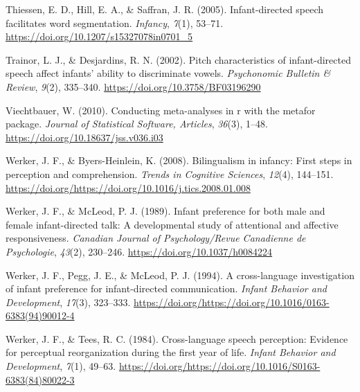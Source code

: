 \documentclass[,man,floatsintext]{apa6}
\begin{document}
\leavevmode\hypertarget{ref-thiessen_2005}{}%
Thiessen, E. D., Hill, E. A., \& Saffran, J. R. (2005). Infant-directed speech facilitates word segmentation. \emph{Infancy}, \emph{7}(1), 53--71. \url{https://doi.org/10.1207/s15327078in0701_5}

\leavevmode\hypertarget{ref-trainor_2002}{}%
Trainor, L. J., \& Desjardins, R. N. (2002). Pitch characteristics of infant-directed speech affect infants' ability to discriminate vowels. \emph{Psychonomic Bulletin \& Review}, \emph{9}(2), 335--340. \url{https://doi.org/10.3758/BF03196290}

\leavevmode\hypertarget{ref-viechtbauer_2010}{}%
Viechtbauer, W. (2010). Conducting meta-analyses in r with the metafor package. \emph{Journal of Statistical Software, Articles}, \emph{36}(3), 1--48. \url{https://doi.org/10.18637/jss.v036.i03}

\leavevmode\hypertarget{ref-werker_2008}{}%
Werker, J. F., \& Byers-Heinlein, K. (2008). Bilingualism in infancy: First steps in perception and comprehension. \emph{Trends in Cognitive Sciences}, \emph{12}(4), 144--151. \url{https://doi.org/https://doi.org/10.1016/j.tics.2008.01.008}

\leavevmode\hypertarget{ref-werker_1989}{}%
Werker, J. F., \& McLeod, P. J. (1989). Infant preference for both male and female infant-directed talk: A developmental study of attentional and affective responsiveness. \emph{Canadian Journal of Psychology/Revue Canadienne de Psychologie}, \emph{43}(2), 230--246. \url{https://doi.org/10.1037/h0084224}

\leavevmode\hypertarget{ref-werker_1994}{}%
Werker, J. F., Pegg, J. E., \& McLeod, P. J. (1994). A cross-language investigation of infant preference for infant-directed communication. \emph{Infant Behavior and Development}, \emph{17}(3), 323--333. \url{https://doi.org/https://doi.org/10.1016/0163-6383(94)90012-4}

\leavevmode\hypertarget{ref-werker_1984}{}%
Werker, J. F., \& Tees, R. C. (1984). Cross-language speech perception: Evidence for perceptual reorganization during the first year of life. \emph{Infant Behavior and Development}, \emph{7}(1), 49--63. \url{https://doi.org/https://doi.org/10.1016/S0163-6383(84)80022-3}

\endgroup

\clearpage
\makeatletter
\efloat@restorefloats
\makeatother
\end{document}

